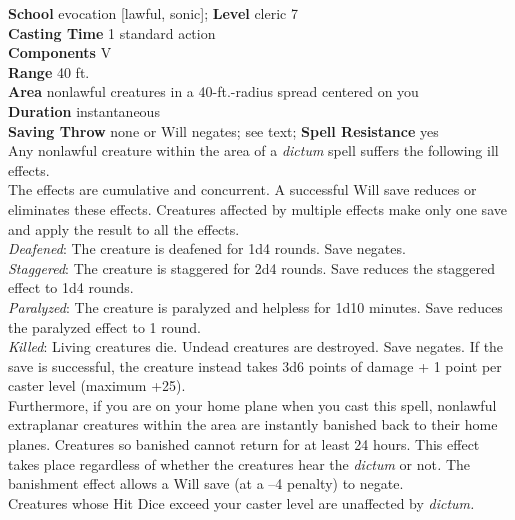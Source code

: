 \textbf{School} evocation [lawful, sonic]; \textbf{Level} cleric 7\\
\textbf{Casting Time} 1 standard action\\
\textbf{Components} V\\
\textbf{Range} 40 ft.\\
\textbf{Area} nonlawful creatures in a 40-ft.-radius spread centered on you\\
\textbf{Duration} instantaneous\\
\textbf{Saving Throw} none or Will negates; see text; \textbf{Spell Resistance} yes\\
Any nonlawful creature within the area of a \textit{dictum }spell suffers the following ill effects.\\
The effects are cumulative and concurrent. A successful Will save reduces or eliminates these effects. Creatures affected by multiple effects make only one save and apply the result to all the effects.\\
\textit{Deafened}: The creature is deafened for 1d4 rounds. Save negates.\\
\textit{Staggered}: The creature is staggered for 2d4 rounds. Save reduces the staggered effect to 1d4 rounds.\\
\textit{Paralyzed}: The creature is paralyzed and helpless for 1d10 minutes. Save reduces the paralyzed effect to 1 round.\\
\textit{Killed}: Living creatures die. Undead creatures are destroyed. Save negates. If the save is successful, the creature instead takes 3d6 points of damage + 1 point per caster level (maximum +25).\\
Furthermore, if you are on your home plane when you cast this spell, nonlawful extraplanar creatures within the area are instantly banished back to their home planes. Creatures so banished cannot return for at least 24 hours. This effect takes place regardless of whether the creatures hear the \textit{dictum }or not\textit{. }The banishment effect allows a Will save (at a –4 penalty) to negate.\\
Creatures whose Hit Dice exceed your caster level are unaffected by \textit{dictum.}\\
